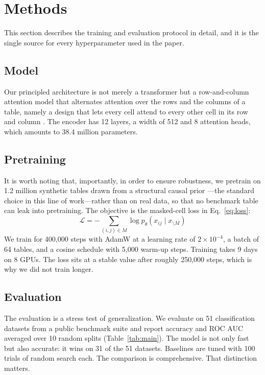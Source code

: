 \section{Methods}
\label{sec:methods}

This section describes the training and evaluation protocol in detail, and it is the single source for every hyperparameter used in the paper.

\subsection{Model}
Our principled architecture is not merely a transformer but a row-and-column attention model that alternates attention over the rows and the columns of a table, namely a design that lets every cell attend to every other cell in its row and column \citep{vaswani2017,gorishniy2021}. The encoder has 12 layers, a width of 512 and 8 attention heads, which amounts to 38.4 million parameters.

\subsection{Pretraining}
It is worth noting that, importantly, in order to ensure robustness, we pretrain on 1.2 million synthetic tables drawn from a structural causal prior \citep{hollmann2023}---the standard choice in this line of work---rather than on real data, so that no benchmark table can leak into pretraining. The objective is the masked-cell loss in Eq.~\ref{eq:loss}:
\begin{equation}
\label{eq:loss}
\mathcal{L} = - \sum_{(i,j) \in M} \log p_\theta(x_{ij} \mid x_{\setminus M})
\end{equation}
We train for 400{,}000 steps with AdamW \citep{loshchilov2019} at a learning rate of $2\times10^{-4}$, a batch of 64 tables, and a cosine schedule with 5{,}000 warm-up steps. Training takes 9 days on 8 GPUs. The loss sits at a stable value after roughly 250{,}000 steps, which is why we did not train longer.

\subsection{Evaluation}
The evaluation is a stress test of generalization. We evaluate on 51 classification datasets from a public benchmark suite \citep{mcelfresh2023} and report accuracy and ROC AUC averaged over 10 random splits (Table~\ref{tab:main}). The model is not only fast but also accurate: it wins on 31 of the 51 datasets. Baselines are tuned with 100 trials of random search each. The comparison is comprehensive. That distinction matters.
